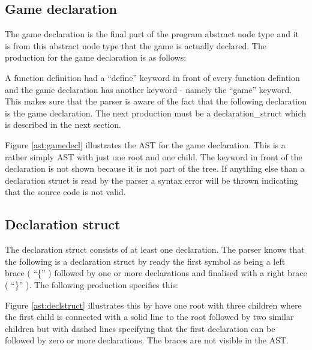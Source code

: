 

\subsection{Game declaration}%
The game declaration is the final part of the program abstract node type and it is from this abstract node type that the game is actually declared. The production for the game declaration is as follows:%

\begin{ebnf}%
%
\end{ebnf}%

A function definition had a ``define'' keyword in front of every function defintion and the game declaration has another keyword - namely the ``game'' keyword. This makes sure that the parser is aware of the fact that the following declaration is the game declaration. The next production must be a declaration\_struct which is described in the next section.%

%

Figure \ref{ast:gamedecl} illustrates the AST for the game declaration. This is a rather simply AST with just one root and one child. The keyword in front of the declaration is not shown because it is not part of the tree. If anything else than a declaration struct is read by the parser a syntax error will be thrown indicating that the source code is not valid.%

\subsection{Declaration struct}%

The declaration struct consists of at least one declaration. The parser knows that the following is a declaration struct by ready the first symbol as being a left brace ( ``\{'' ) followed by one or more declarations and finalised with a right brace ( ``\}'' ). The following production specifies this:%

\begin{ebnf}%
%
\end{ebnf}%

%

Figure \ref{ast:declstruct} illustrates this by have one root with three children where the first child is connected with a solid line to the root followed by two similar children but with dashed lines specifying that the first declaration can be followed by zero or more declarations. The braces are not visible in the AST.%

